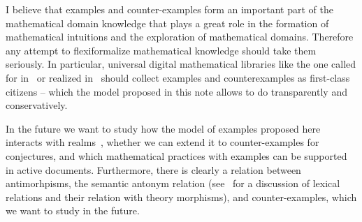 \documentclass[11pt]{bluenote}
\begin{document}
I believe that examples and counter-examples form an important part of the mathematical
domain knowledge that plays a great role in the formation of mathematical intuitions and
the exploration of mathematical domains. Therefore any attempt to flexiformalize
mathematical knowledge should take them seriously. In particular, universal digital
mathematical libraries like the one called for in~\cite{Farmer:mkm11} or realized
in~\cite{IanJucKoh:sdm14,MathHub:on} should collect examples and counterexamples as
first-class citizens -- which the model proposed in this note allows to do transparently
and conservatively.

In the future we want to study how the model of examples proposed here interacts with
realms~\cite{CarFarKoh:rsckmt14}, whether we can extend it to counter-examples for
conjectures, and which mathematical practices with examples can be supported in active
documents. Furthermore, there is clearly a relation between antimorhpisms, the semantic
antonym relation (see~\cite{Kohlhase:dmesmgm14} for a discussion of lexical relations and
their relation with theory morphisms), and counter-examples, which we want to study in the
future.

\printbibliography
\end{document}
